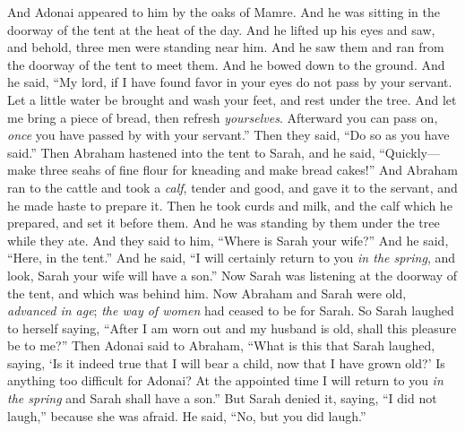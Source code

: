 \begin{biblechapter} %
 And Adonai appeared to him by the oaks of Mamre. And he was sitting in the doorway of the tent at the heat of the day.
\verse And he lifted up his eyes and saw, and behold, three men were standing near him. And he saw them and ran from the doorway of the tent to meet them. And he bowed down to the ground.
\verse And he said, “My lord, if I have found favor in your eyes do not pass by your servant.
\verse Let a little water be brought and wash your feet, and rest under the tree.
\verse And let me bring a piece of bread, then refresh \textit{yourselves}. Afterward you can pass on, \textit{once} you have passed by with your servant.” Then they said, “Do so as you have said.”
\verse Then Abraham hastened into the tent to Sarah, and he said, “Quickly—make three seahs of fine flour for kneading and make bread cakes!”
\verse And Abraham ran to the cattle and took a \textit{calf}, tender and good, and gave it to the servant, and he made haste to prepare it.
\verse Then he took curds and milk, and the calf which he prepared, and set it before them. And he was standing by them under the tree while they ate.
\verse And they said to him, “Where is Sarah your wife?” And he said, “Here, in the tent.”
\verse And he said, “I will certainly return to you \textit{in the spring}, and look, Sarah your wife will have a son.” Now Sarah was listening at the doorway of the tent, and which was behind him.
\verse Now Abraham and Sarah were old, \textit{advanced in age}; \textit{the way of women} had ceased to be for Sarah.
\verse So Sarah laughed to herself saying, “After I am worn out and my husband is old, shall this pleasure be to me?”
\verse Then Adonai said to Abraham, “What is this that Sarah laughed, saying, ‘Is it indeed true that I will bear a child, now that I have grown old?’
\verse Is anything too difficult for Adonai? At the appointed time I will return to you \textit{in the spring} and Sarah shall have a son.”
\verse But Sarah denied it, saying, “I did not laugh,” because she was afraid. He said, “No, but you did laugh.”

\end{biblechapter}
